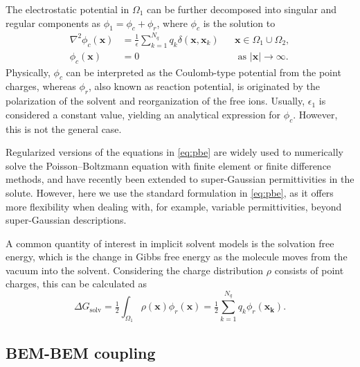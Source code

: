 The electrostatic potential in $\Omega_1$ can be further decomposed into singular and regular components as $\phi_1 = \phi_c + \phi_r$, where $\phi_c$ is the solution to
%
\begin{align}\label{eq:phic}
\nabla^2\phi_c(\mathbf{x}) &= \tfrac{1}{\epsilon}\sum_{k=1}^{N_q}q_k\delta(\mathbf{x},\mathbf{x}_k) &&\mathbf{x}\in\Omega_1\cup\Omega_2,\nonumber\\
\phi_c(\mathbf{x})&=0 &&\text{ as } |\mathbf{x}|\to\infty.
\end{align}
Physically, $\phi_c$ can be interpreted as the Coulomb-type potential from the point charges, whereas $\phi_r$, also known as reaction potential, is originated by the polarization of the solvent and reorganization of the free ions. 
Usually, $\epsilon_1$ is considered a constant value, yielding an analytical expression for $\phi_c$. However, this is not the general case.

Regularized versions of the equations in \eqref{eq:pbe} \cite{LuZhouHolstMcCammon2008,LeeGengZhao2021} are widely used to numerically solve the Poisson--Boltzmann equation with finite element or finite difference methods, and have recently been extended to super-Gaussian permittivities in the solute.\cite{wang2022regularization} However, here we use the standard formulation in \eqref{eq:pbe}, as it offers more flexibility when dealing with, for example, variable permittivities, beyond super-Gaussian descriptions.

A common quantity of interest in implicit solvent models is the solvation free energy, which is the change in Gibbs free energy as the molecule moves from the vacuum into the solvent. Considering the charge distribution $\rho$ consists of point charges, this can be calculated as
%
\begin{equation}\label{eq:dG} 
\Delta G_{\text{solv}} = \tfrac{1}{2}\int_{\Omega_1} \rho(\mathbf{x})\phi_{r}(\mathbf{x}) = \tfrac{1}{2}\sum_{k=1}^{N_q} q_k\phi_r(\mathbf{x_k}).
\end{equation}

\subsection*{\sffamily \large BEM-BEM coupling}


